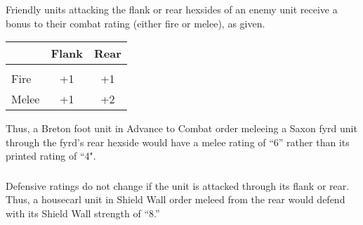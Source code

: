 \subsubsection[Flank or Rear]{} Friendly units attacking the flank or rear hexsides of an enemy unit receive a bonus to their combat rating (either fire or melee), as given.

\begin{tabular}{ lcc }
  & \textbf{Flank} & \textbf{Rear} \\
  \hline \\ [-2.0ex]
  Fire & +1 & +1 \\
  Melee & +1 & +2 \\
\end{tabular}

Thus, a Breton foot unit in Advance to Combat order meleeing a Saxon fyrd unit through the fyrd's rear hexside would have a melee rating of “6” rather than its printed rating of “4".

\subsubsection[Defensive Ratings]{} Defensive ratings do not change if the unit is attacked through its flank or rear. Thus, a housecarl unit in Shield Wall order meleed from the rear would defend with its Shield Wall strength of “8.”
